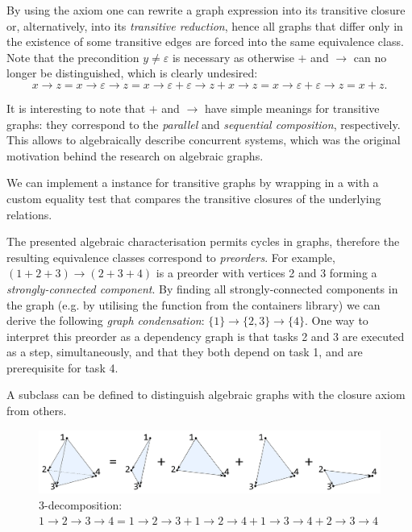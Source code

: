 By using the axiom one can rewrite a graph expression into its transitive closure or,
alternatively, into its \emph{transitive reduction}, hence all graphs that differ only in the
existence of some transitive edges are forced into the same equivalence class. Note that the
precondition $y \neq \varepsilon$ is necessary as otherwise $+$ and $\rightarrow$ can no
longer be distinguished, which is clearly undesired:
\[
x \rightarrow z = x \rightarrow \varepsilon \rightarrow z = x \rightarrow \varepsilon
 + \varepsilon \rightarrow z + x \rightarrow z = x \rightarrow \varepsilon
 + \varepsilon \rightarrow z = x + z.
\]

It is interesting to note that $+$ and $\rightarrow$ have simple meanings for transitive
graphs: they correspond to the \emph{parallel} and \emph{sequential composition},
respectively. This allows to algebraically describe concurrent systems, which was
the original motivation behind the research on algebraic graphs.

We can implement a  instance for transitive graphs by wrapping
 in a  with a custom equality test that
compares the transitive closures of the underlying relations.

The presented algebraic characterisation permits cycles in graphs, therefore the
resulting equivalence classes correspond to \emph{preorders}. For example,
$(1 + 2 + 3) \rightarrow (2 + 3 + 4)$
is a preorder with vertices 2 and 3 forming a \emph{strongly-connected component}. By
finding all strongly-connected components in the graph (e.g. by utilising the
function  from the \textsf{containers} library) we can derive the
following \emph{graph condensation}:
$\{1\} \rightarrow \{2, 3\} \rightarrow \{4\}$. One way to interpret this preorder as a
dependency graph is that tasks 2 and 3 are executed as a step,
simultaneously, and that they both depend on task 1, and are prerequisite for task 4.

A subclass  can be defined to distinguish
algebraic graphs with the closure axiom from others.

\begin{figure}
\centerline{\includegraphics[scale=0.12]{fig/3-decomposition.pdf}}
\caption{3-decomposition:
    $1 \rightarrow 2 \rightarrow 3 \rightarrow 4 =
    1 \rightarrow 2 \rightarrow 3 + 1 \rightarrow 2 \rightarrow 4 +
    1 \rightarrow 3 \rightarrow 4 + 2 \rightarrow 3 \rightarrow 4$
    \label{fig-3-decomposition}}
\end{figure}

